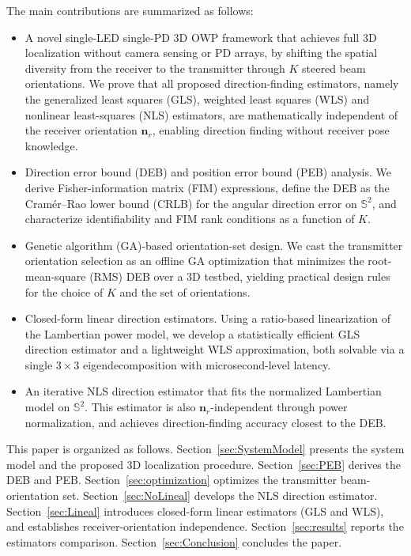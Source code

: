 \documentclass[journal]{IEEEtran}
\newcommand{\added}[1]{{\color{blue}#1}}
\begin{document}
\added{The main contributions are summarized as follows:}
\begin{itemize}
    \item \added{A novel single-LED single-PD 3D OWP framework that achieves full 3D localization without camera sensing or PD arrays, by shifting the spatial diversity from the receiver to the transmitter through $K$ steered beam orientations. We prove that all proposed direction-finding estimators, namely the generalized least squares (GLS), weighted least squares (WLS) and nonlinear least-squares (NLS) estimators, are mathematically independent of the receiver orientation $\mathbf{n}_r$, enabling direction finding without receiver pose knowledge.}
    \item \added{Direction error bound (DEB) and position error bound (PEB) analysis. We derive Fisher-information matrix (FIM) expressions, define the DEB as the Cramér--Rao lower bound (CRLB) for the angular direction error on $\mathbb{S}^2$, and characterize identifiability and FIM rank conditions as a function of $K$.}
    \item \added{Genetic algorithm (GA)-based orientation-set design. We cast the transmitter orientation selection as an offline GA optimization that minimizes the root-mean-square (RMS) DEB over a 3D testbed, yielding practical design rules for the choice of $K$ and the set of orientations.}
    \item \added{Closed-form linear direction estimators. Using a ratio-based linearization of the Lambertian power model, we develop a statistically efficient GLS direction estimator and a lightweight WLS approximation, both solvable via a single $3\times3$ eigendecomposition with microsecond-level latency.}
    \item \added{An iterative NLS direction estimator that fits the normalized Lambertian model on $\mathbb{S}^2$. This estimator is also $\mathbf{n}_r$-independent through power normalization, and achieves direction-finding accuracy closest to the DEB.}
\end{itemize}

\added{This paper is organized as follows.}
Section~\ref{sec:SystemModel} presents the system model and the proposed 3D localization procedure.
Section~\ref{sec:PEB} derives the \added{DEB and PEB}.
Section~\ref{sec:optimization} optimizes the transmitter beam-orientation set.
Section~\ref{sec:NoLineal} develops \added{the NLS} direction estimator.
Section~\ref{sec:Lineal} introduces closed-form linear estimators (GLS and WLS)\added{, and establishes receiver-orientation independence}.
Section~\ref{sec:results} reports \added{the estimators comparison}.
Section~\ref{sec:Conclusion} concludes the paper.
\end{document}
